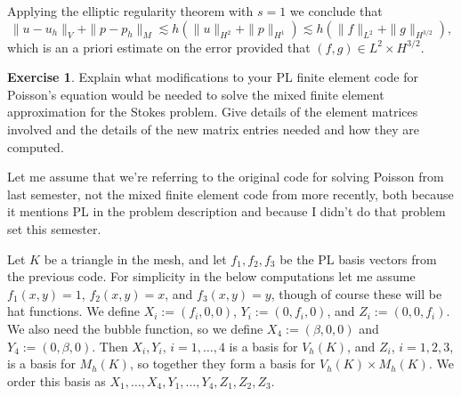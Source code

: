 \documentclass[10pt]{article}
\theoremstyle{definition}
\newtheorem{exer}{Exercise}
\begin{document}
Applying the elliptic regularity theorem with $s = 1$ we conclude that 
$$\|u - u_h\|_V + \|p - p_h\|_M \lesssim h\left(\|u\|_{H^2} + \|p\|_{H^1}\right) \lesssim h\left(\|f\|_{L^2} + \|g\|_{H^{3/2}}\right),$$
which is an a priori estimate on the error provided that $(f, g) \in L^2 \times H^{3/2}$.

\begin{exer}
    Explain what modifications to your PL finite element code for Poisson's equation would be needed to solve the mixed finite element approximation for the Stokes problem. Give details of the element matrices involved and the details of the new matrix entries needed and how they are computed.
\end{exer}

Let me assume that we're referring to the original code for solving Poisson from last semester, not the mixed finite element code from more recently, both because it mentions PL in the problem description and because I didn't do that problem set this semester.

Let $K$ be a triangle in the mesh, and let $f_1, f_2, f_3$ be the PL basis vectors from the previous code.
For simplicity in the below computations let me assume $f_1(x, y) = 1$, $f_2(x, y) = x$, and $f_3(x, y) = y$, though of course these will be hat functions.
We define $X_i := (f_i, 0, 0)$, $Y_i := (0, f_i, 0)$, and $Z_i := (0, 0, f_i)$.
We also need the bubble function, so we define $X_4 := (\beta, 0, 0)$ and $Y_4 := (0, \beta, 0)$.
Then $X_i, Y_i$, $i=1, \dots, 4$ is a basis for $V_h(K)$, and $Z_i$, $i=1, 2, 3$, is a basis for $M_h(K)$, so together they form a basis for $V_h(K) \times M_h(K)$.
We order this basis as $X_1, \dots, X_4, Y_1, \dots, Y_4, Z_1, Z_2, Z_3$.
\end{document}
